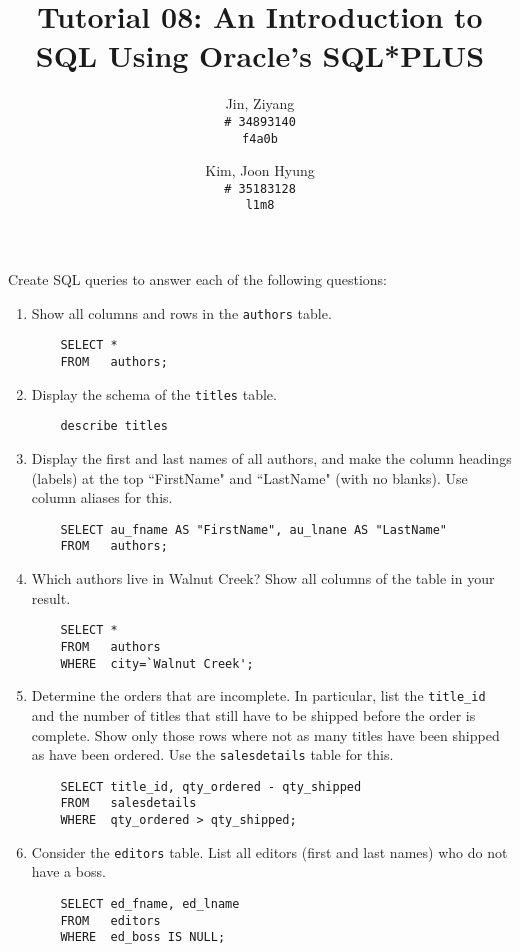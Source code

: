 \documentclass{article}
\title{Tutorial 08: An Introduction to SQL Using Oracle's SQL*PLUS}
\author{
	Jin, Ziyang\\
	\texttt{\# 34893140}\\
	\texttt{f4a0b}
	\and
	Kim, Joon Hyung\\
	\texttt{\# 35183128}\\
	\texttt{l1m8}
}
\begin{document}
	\maketitle

\noindent Create SQL queries to answer each of the following questions:

\begin{enumerate}
\item Show all columns and rows in the \texttt{authors} table.
	\begin{verbatim}
	SELECT *
	FROM   authors;
	\end{verbatim}

\item Display the schema of the \texttt{titles} table.
	\begin{verbatim}
	describe titles
	\end{verbatim}
	
\item Display the first and last names of all authors, and make the column headings (labels) at the top ``FirstName" and ``LastName" (with no blanks). Use column aliases for this.
	\begin{verbatim}
	SELECT au_fname AS "FirstName", au_lnane AS "LastName"
	FROM   authors;
	\end{verbatim}

\item Which authors live in Walnut Creek? Show all columns of the table in your result.
	\begin{verbatim}
	SELECT *
	FROM   authors
	WHERE  city=`Walnut Creek';
	\end{verbatim}
	
\item Determine the orders that are incomplete. In particular, list the \texttt{title\_id} and the number of titles that still have to be shipped before the order is complete. Show only those rows where not as many titles have been shipped as have been ordered. Use the \texttt{salesdetails} table for this.
	\begin{verbatim}
	SELECT title_id, qty_ordered - qty_shipped
	FROM   salesdetails
	WHERE  qty_ordered > qty_shipped;
	\end{verbatim}

\item Consider the \texttt{editors} table. List all editors (first and last names) who do not have a boss.
	\begin{verbatim}
	SELECT ed_fname, ed_lname
	FROM   editors
	WHERE  ed_boss IS NULL;
	\end{verbatim}


\end{enumerate}
\end{document}
